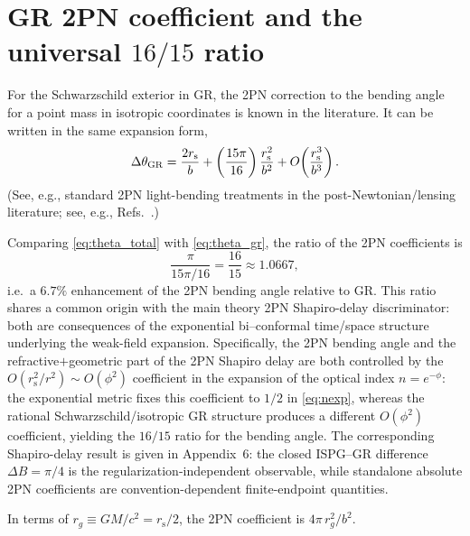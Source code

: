 \documentclass[11pt]{article}
\newcommand{\rs}{r_{\mathrm{s}}}
\begin{document}
\section{GR 2PN coefficient and the universal $16/15$ ratio}\label{sec:grcomp}
For the Schwarzschild exterior in GR, the 2PN correction to the bending angle for a point mass in isotropic coordinates is known in the literature. It can be written in the same expansion form,
\begin{equation}
\Delta\theta_{\rm GR}
=\frac{2\rs}{b}+\left(\frac{15\pi}{16}\right)\frac{\rs^2}{b^2}
+O\!\left(\frac{\rs^3}{b^3}\right).
\label{eq:theta_gr}
\end{equation}
(See, e.g., standard 2PN light-bending treatments in the post-Newtonian/lensing literature; see, e.g., Refs.~\cite{EpsteinShapiro1980,BodennerWill2003,KeetonPetters2005}.)

Comparing \eqref{eq:theta_total} with \eqref{eq:theta_gr}, the ratio of the 2PN coefficients is
\begin{equation}
\frac{\pi}{15\pi/16}=\frac{16}{15}\approx 1.0667,
\label{eq:ratio1615}
\end{equation}
i.e.\ a $6.7\%$ enhancement of the 2PN bending angle relative to GR. This ratio shares a common origin with the main theory 2PN Shapiro-delay discriminator: both are consequences of the exponential bi--conformal time/space structure underlying the weak-field expansion. Specifically, the 2PN bending angle and the refractive$+$geometric part of the 2PN Shapiro delay are both controlled by the $O(\rs^2/r^2)\sim O(\phi^2)$ coefficient in the expansion of the optical index $n=e^{-\phi}$: the exponential metric fixes this coefficient to $1/2$ in \eqref{eq:nexp}, whereas the rational Schwarzschild/isotropic GR structure produces a different $O(\phi^2)$ coefficient, yielding the $16/15$ ratio for the bending angle. The corresponding Shapiro-delay result is given in Appendix~6: the closed ISPG--GR difference $\Delta B = \pi/4$ is the regularization-independent observable, while standalone absolute 2PN coefficients are convention-dependent finite-endpoint quantities.

In terms of $r_g\equiv GM/c^2=\rs/2$, the 2PN coefficient is $4\pi\,r_g^2/b^2$.
\end{document}
